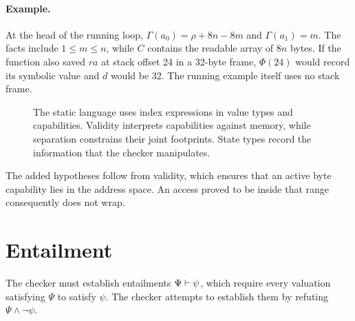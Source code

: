\paragraph{Example.} At the head of the running loop, $\Gamma(a_0)=\rho+8n-8m$ and $\Gamma(a_1)=m$. The facts include $1\le m\le n$, while $C$ contains the readable array of $8n$ bytes. If the function also saved $ra$ at stack offset 24 in a 32-byte frame, $\Phi(24)$ would record its symbolic value and $d$ would be 32. The running example itself uses no stack frame.
\begin{figure}[t]
\centering
{}
\caption{The static language uses index expressions in value types and capabilities. Validity interprets capabilities against memory, while separation constrains their joint footprints. State types record the information that the checker manipulates.}
\end{figure}


The added hypotheses follow from validity, which ensures that an active byte capability lies in the address space. An access proved to be inside that range consequently does not wrap.

\section{Entailment}\label{sec:entail}
The checker must establish entailments $\Psi\vdash\psi$, which require every valuation satisfying $\Psi$ to satisfy $\psi$. The checker attempts to establish them by refuting $\Psi\land\lnot\psi$.

